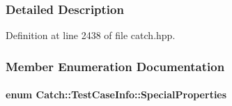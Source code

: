 \subsubsection{Detailed Description}


Definition at line 2438 of file catch.\+hpp.



\subsubsection{Member Enumeration Documentation}
\hypertarget{a00086_a39b232f74b4a7a6f2183b96759027eac}{}
\paragraph[{Special\+Properties}]{\setlength{\rightskip}{0pt plus 5cm}enum {\bf Catch\+::\+Test\+Case\+Info\+::\+Special\+Properties}}\label{a00086_a39b232f74b4a7a6f2183b96759027eac}
